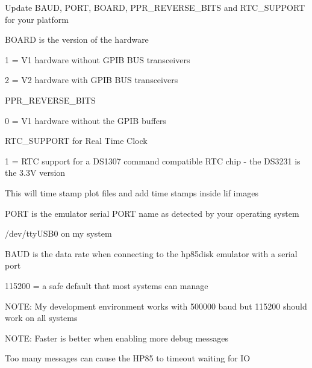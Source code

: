 \begin{DoxyItemize}
\item Update B\+A\+UD, P\+O\+RT, B\+O\+A\+RD, P\+P\+R\+\_\+\+R\+E\+V\+E\+R\+S\+E\+\_\+\+B\+I\+TS and R\+T\+C\+\_\+\+S\+U\+P\+P\+O\+RT for your platform
\begin{DoxyItemize}
\item B\+O\+A\+RD is the version of the hardware
\begin{DoxyItemize}
\item 1 = V1 hardware without G\+P\+IB B\+US transceivers
\item 2 = V2 hardware with G\+P\+IB B\+US transceivers
\end{DoxyItemize}
\item P\+P\+R\+\_\+\+R\+E\+V\+E\+R\+S\+E\+\_\+\+B\+I\+TS
\begin{DoxyItemize}
\item 0 = V1 hardware without the G\+P\+IB buffers
\end{DoxyItemize}
\item R\+T\+C\+\_\+\+S\+U\+P\+P\+O\+RT for Real Time Clock
\begin{DoxyItemize}
\item 1 = R\+TC support for a D\+S1307 command compatible R\+TC chip -\/ the D\+S3231 is the 3.\+3V version
\begin{DoxyItemize}
\item This will time stamp plot files and add time stamps inside lif images
\end{DoxyItemize}
\end{DoxyItemize}
\item P\+O\+RT is the emulator serial P\+O\+RT name as detected by your operating system
\begin{DoxyItemize}
\item /dev/tty\+U\+S\+B0 on my system
\end{DoxyItemize}
\item B\+A\+UD is the data rate when connecting to the hp85disk emulator with a serial port
\begin{DoxyItemize}
\item 115200 = a safe default that most systems can manage
\begin{DoxyItemize}
\item N\+O\+TE\+: My development environment works with 500000 baud but 115200 should work on all systems
\item N\+O\+TE\+: Faster is better when enabling more debug messages
\begin{DoxyItemize}
\item Too many messages can cause the H\+P85 to timeout waiting for IO 


\end{DoxyItemize}
\end{DoxyItemize}
\end{DoxyItemize}
\end{DoxyItemize}
\end{DoxyItemize}

